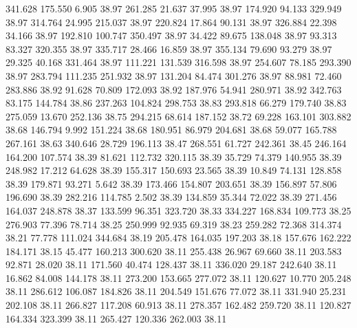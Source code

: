  341.628  175.550    6.905        38.97
 261.285   21.637   37.995        38.97
 174.920   94.133  329.949        38.97
 314.764   24.995  215.037        38.97
 220.824   17.864   90.131        38.97
 326.884   22.398   34.166        38.97
 192.810  100.747  350.497        38.97
  34.422   89.675  138.048        38.97
  93.313   83.327  320.355        38.97
 335.717   28.466   16.859        38.97
 355.134   79.690   93.279        38.97
  29.325   40.168  331.464        38.97
 111.221  131.539  316.598        38.97
 254.607   78.185  293.390        38.97
 283.794  111.235  251.932        38.97
 131.204   84.474  301.276        38.97
  88.981   72.460  283.886        38.92
  91.628   70.809  172.093        38.92
 187.976   54.941  280.971        38.92
 342.763   83.175  144.784        38.86
 237.263  104.824  298.753        38.83
 293.818   66.279  179.740        38.83
 275.059   13.670  252.136        38.75
 294.215   68.614  187.152        38.72
  69.228  163.101  303.882        38.68
 146.794    9.992  151.224        38.68
 180.951   86.979  204.681        38.68
  59.077  165.788  267.161        38.63
 340.646   28.729  196.113        38.47
 268.551   61.727  242.361        38.45
 246.164  164.200  107.574        38.39
  81.621  112.732  320.115        38.39
  35.729   74.379  140.955        38.39
 248.982   17.212   64.628        38.39
 155.317  150.693   23.565        38.39
  10.849   74.131  128.858        38.39
 179.871   93.271    5.642        38.39
 173.466  154.807  203.651        38.39
 156.897   57.806  196.690        38.39
 282.216  114.785    2.502        38.39
 134.859   35.344   72.022        38.39
 271.456  164.037  248.878        38.37
 133.599   96.351  323.720        38.33
 334.227  168.834  109.773        38.25
 276.903   77.396   78.714        38.25
 250.999   92.935   69.319        38.23
 259.282   72.368  314.374        38.21
  77.778  111.024  344.684        38.19
 205.478  164.035  197.203        38.18
 157.676  162.222  184.171        38.15
  45.477  160.213  300.620        38.11
 255.438   26.967   69.660        38.11
 203.583   92.871   28.020        38.11
 171.560   40.474  128.437        38.11
 336.020   29.187  242.640        38.11
  16.862   84.008  144.178        38.11
 273.200  153.665  277.072        38.11
 120.627   10.770  205.248        38.11
 286.612  106.087  184.826        38.11
 204.549  151.676   77.072        38.11
 331.940   25.231  202.108        38.11
 266.827  117.208   60.913        38.11
 278.357  162.482  259.720        38.11
 120.827  164.334  323.399        38.11
 265.427  120.336  262.003        38.11
